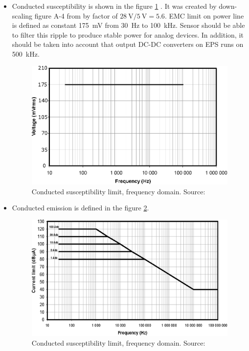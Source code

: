         \begin{itemize}
            \item Conducted susceptibility is shown in the figure \ref{EMC_conducted_susceptibility} . It was created by down-scaling figure A-4 from \cite{ECSS_E_ST_20_07C} by factor of $\SI{28}{\volt}/\SI{5}{\volt} = 5.6$. EMC limit on power line is defined as constant \SI{175}{\milli\volt} from \SI{30}{\hertz} to \SI{100}{\kilo\hertz}. Sensor should be able to filter this ripple to produce stable power for analog devices. In addition, it should be taken into account that output DC-DC converters on EPS runs on \SI{500}{\kilo\hertz}.

            \begin{figure}[H]
                \centering
                \includegraphics[width=0.5\paperwidth]{img/EMC_conducted_susceptibility.eps}
                \caption{Conducted susceptibility limit, frequency domain. Source: \cite{ECSS_E_ST_20_07C}}
                \label{EMC_conducted_susceptibility}
            \end{figure}


            \item Conducted emission is defined in the figure \ref{EMC_conducted_emission}.

            \begin{figure}[H]
                \centering
                \includegraphics[width=0.5\paperwidth]{img/EMC_conducted_emission.eps}
                \caption{Conducted susceptibility limit, frequency domain. Source: \cite{ECSS_E_ST_20_07C}}
                \label{EMC_conducted_emission}
            \end{figure}



\end{itemize}

